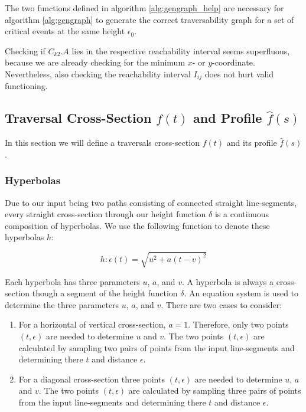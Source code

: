 The two functions defined in algorithm \ref{alg:gengraph_help} are necessary for algorithm \ref{alg:gengraph} to generate the correct traversability graph for a set of critical events at the same height $\epsilon_0$.

Checking if $C_{k2}.A$ lies in the respective reachability interval seems superfluous, because we are already checking for the minimum $x$- or $y$-coordinate. Nevertheless, also checking the reachability interval $I_{ij}$ does not hurt valid functioning.


\subsection{Traversal Cross-Section $f(t)$ and Profile $\hat{f}(s)$}\label{sec:trav_csp}

In this section we will define a traversals cross-section $f(t)$ and its profile $\hat{f}(s)$.

\subsubsection{Hyperbolas}

Due to our input being two paths consisting of connected straight line-segments, every straight cross-section through our height function $\delta$ is a continuous composition of hyperbolas. We use the following function to denote these hyperbolas $h$:

$$h: \epsilon(t) = \sqrt{u^2 + a(t - v)^2}$$

Each hyperbola has three parameters $u$, $a$, and $v$. A hyperbola is always a cross-section though a segment of the height function $\delta$. An equation system is used to determine the three parameters $u$, $a$, and $v$. There are two cases to consider:

\begin{enumerate}
	\item For a horizontal of vertical cross-section, $a = 1$. Therefore, only two points $(t, \epsilon)$ are needed to determine $u$ and $v$. The two points $(t, \epsilon)$ are calculated by sampling two pairs of points from the input line-segments and determining there $t$ and distance $\epsilon$.
	\item For a diagonal cross-section three points $(t, \epsilon)$ are needed to determine $u$, $a$ and $v$. The two points $(t, \epsilon)$ are calculated by sampling three pairs of points from the input line-segments and determining there $t$ and distance $\epsilon$.
\end{enumerate}

